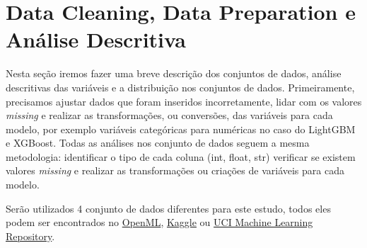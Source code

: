 \section{Data Cleaning, Data Preparation e Análise Descritiva}
Nesta seção iremos fazer uma breve descrição dos conjuntos de dados, análise descritivas das variáveis e a distribuição nos conjuntos de dados. Primeiramente, precisamos ajustar dados que foram inseridos incorretamente, lidar com os valores \textit{missing} e realizar as transformações, ou conversões, das variáveis para cada modelo, por exemplo variáveis categóricas para numéricas no caso do LightGBM e XGBoost. 
Todas as análises nos conjunto de dados seguem a mesma metodologia: identificar o tipo de cada coluna (int, float, str) verificar se existem valores \textit{missing} e realizar as transformações ou criações de variáveis para cada modelo.

Serão utilizados 4 conjunto de dados diferentes para este estudo, todos eles podem ser encontrados no \href{https://www.openml.org/}{OpenML}, \href{https://www.kaggle.com/}{Kaggle} ou \href{https://archive.ics.uci.edu/ml/index.php}{UCI Machine Learning Repository}. 
